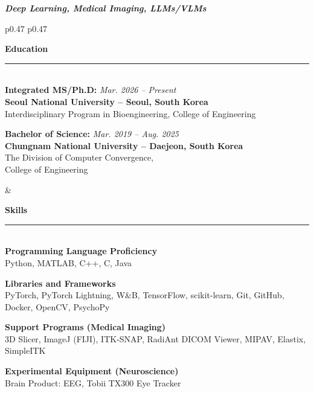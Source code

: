 \documentclass{resume}
\begin{document}
{\centerline {\em \textbf { Deep Learning, Medical Imaging, LLMs/VLMs } } }

\begin{table}[h!]
\begin{tabular}{p{0.47\textwidth} p{0.47\textwidth}}
\begin{minipage}[t]{\linewidth}
    \vspace{0pt}
    {\Large \textbf{Education}} \\
    \rule{\linewidth}{0.3pt}\\[4pt]

    \textbf{Integrated MS/Ph.D:} \textit{Mar. 2026 -- Present} \\
    \textbf{Seoul National University -- Seoul, South Korea}\\
    Interdisciplinary Program in Bioengineering, College of Engineering
    
    \bigskip
    \textbf{Bachelor of Science:} \textit{Mar. 2019 -- Aug. 2025} \\
    \textbf{Chungnam National University -- Daejeon, South Korea}\\
    The Division of Computer Convergence, \\ College of Engineering
\end{minipage}
&
\begin{minipage}[t]{\linewidth}
    \vspace{0pt}
    {\Large \textbf{Skills}} \\
    \rule{\linewidth}{0.3pt}\\[2pt]

    \textbf{Programming Language Proficiency} \\
    Python, MATLAB, C++, C, Java

    \vspace{1pt}
    \textbf{Libraries and Frameworks} \\
    PyTorch, PyTorch Lightning, W\&B, TensorFlow, scikit-learn, Git, GitHub, Docker, OpenCV, PsychoPy

    \vspace{1pt}
    \textbf{Support Programs (Medical Imaging)} \\
    3D Slicer, ImageJ (FIJI), ITK-SNAP, RadiAnt DICOM Viewer, MIPAV, Elastix, SimpleITK

    \vspace{1pt}
    \textbf{Experimental Equipment (Neuroscience)} \\
    Brain Product: EEG, Tobii TX300 Eye Tracker

\end{minipage}
\end{tabular}
\end{table}
\end{document}
